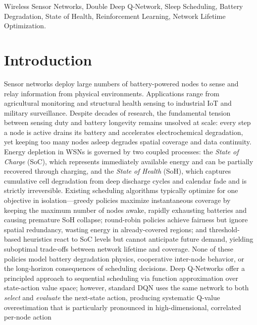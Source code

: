 \documentclass[journal]{IEEEtran}
\begin{document}
\begin{IEEEkeywords}
Wireless Sensor Networks, Double Deep Q-Network, Sleep Scheduling,
Battery Degradation, State of Health, Reinforcement Learning, Network
Lifetime Optimization.
\end{IEEEkeywords}

\section{Introduction}
\label{sec:intro}

 Sensor networks deploy large numbers of
battery-powered nodes to sense and relay information from physical
environments. Applications range from agricultural monitoring and
structural health sensing to industrial IoT and military surveillance.
Despite decades of research, the fundamental tension between sensing duty
and battery longevity remains unsolved at scale: every step a node is
active drains its battery and accelerates electrochemical degradation,
yet keeping too many nodes asleep degrades spatial coverage and data
continuity.
\IEEEpubidadjcol
Energy depletion in WSNs is governed by two coupled processes: the
\textit{State of Charge} (SoC), which represents immediately available
energy and can be partially recovered through charging, and the
\textit{State of Health} (SoH), which captures cumulative cell
degradation from deep discharge cycles and calendar fade and is strictly
irreversible. Existing scheduling algorithms typically optimize for one
objective in isolation—greedy policies maximize instantaneous coverage
by keeping the maximum number of nodes awake, rapidly exhausting
batteries and causing premature SoH collapse; round-robin policies
achieve fairness but ignore spatial redundancy, wasting energy in
already-covered regions; and threshold-based heuristics react to SoC
levels but cannot anticipate future demand, yielding suboptimal
trade-offs between network lifetime and coverage. None of these policies
model battery degradation physics, cooperative inter-node behavior, or
the long-horizon consequences of scheduling decisions. Deep Q-Networks
offer a principled approach to sequential scheduling via function
approximation over state-action value space; however, standard DQN uses
the same network to both \textit{select} and \textit{evaluate} the
next-state action, producing systematic Q-value overestimation that is
particularly pronounced in high-dimensional, correlated per-node action
\end{document}
